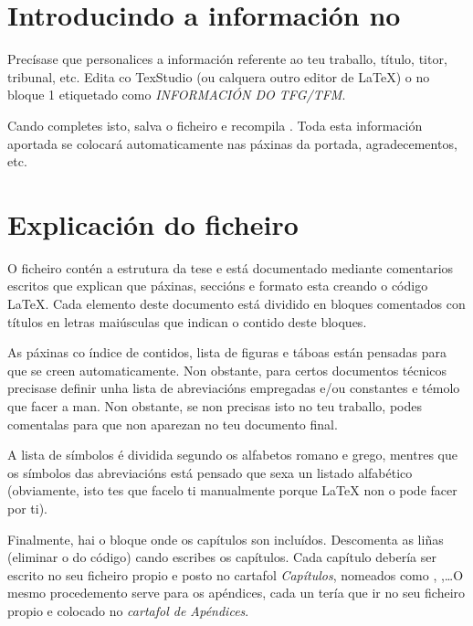 
\section{Introducindo a información no }\label{FillingFile}

Precísase que personalices a información referente ao teu traballo, título, titor, tribunal, etc. Edita co TexStudio (ou calquera outro editor de \LaTeX{}) o  no bloque 1 etiquetado como \emph{INFORMACIÓN DO TFG/TFM}.

Cando completes isto, salva o ficheiro e recompila . Toda esta información aportada se colocará automaticamente nas páxinas da portada, agradecementos, etc.



\section{Explicación do ficheiro }\label{ThesisConventions}

O ficheiro  contén a estrutura da tese e está documentado mediante comentarios escritos que explican que páxinas, seccións e formato esta creando o código \LaTeX{}. Cada elemento deste documento está dividido en bloques comentados con títulos en letras maiúsculas que indican o contido deste bloques.
	
As páxinas co índice de contidos, lista de figuras e táboas están pensadas para que se creen automaticamente. Non obstante, para certos documentos técnicos precisase definir unha lista de abreviacións empregadas e/ou constantes e témolo que facer a man. Non obstante, se non precisas isto no teu traballo, podes comentalas para que non aparezan no teu documento final. 
	
A lista de símbolos é dividida segundo os alfabetos romano e grego, mentres que os símbolos das abreviacións está pensado que sexa un listado alfabético (obviamente, isto tes que facelo ti manualmente porque LaTeX{} non o pode facer por ti).
	

Finalmente, hai o bloque onde os capítulos son incluídos. Descomenta as liñas (eliminar o \code{\%} do código) cando escribes os capítulos. Cada capítulo debería ser escrito no seu ficheiro propio e posto no cartafol \emph{Capítulos}, nomeados como , ,\ldots O mesmo procedemento serve para os apéndices, cada un tería que ir no seu ficheiro propio e colocado no \emph{cartafol de Apéndices}.
		
